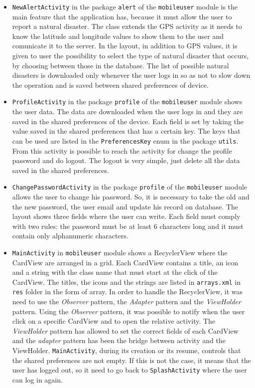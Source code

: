 \documentclass[a4paper,12pt]{report}
\begin{document}
\begin{itemize}
\item \texttt{NewAlertActivity} in the package \texttt{alert} of the \texttt{mobileuser} module is the main feature that the application has, because it must allow the user to report a natural disaster. The class extends the GPS activity as it needs to know the latitude and longitude values to show them to the user and comunicate it to the server. In the layout, in addition to GPS values, it is given to user the possibility to select the type of natural disaster that occurs, by choosing between those in the database. The list of possible natural disasters is downloaded only whenever the user logs in so as not to slow down the operation and is saved between shared preferences of device.
\item \texttt{ProfileActivity} in the package \texttt{profile} of the \texttt{mobileuser} module shows the user data. The data are downloaded when the user logs in and they are saved in the shared preferences of the device. Each field is set by taking the value saved in the shared preferences that has a certain key. The keys that can be used are listed in the \texttt{PreferencesKey} enum in the package \texttt{utils}. From this activity is possible to reach the activity for change the profile password and do logout. The logout is very simple, just delete all the data saved in the shared preferences.
\item \texttt{ChangePasswordActivity} in the package \texttt{profile} of the \texttt{mobileuser} module allows the user to change his password. So, it is necessary to take the old and the new password, the user email and update his record on database. The layout shows three fields where the user can write. Each field must comply with two rules: the password must be at least 6 characters long and it must contain only alphanumeric characters.
\item \texttt{MainActivity} in \texttt{mobileuser} module shows a RecyclerView where the CardView are arranged in a grid. Each CardView contains a title, an icon and a string with the class name that must start at the click of the CardView. The titles, the icons and the strings are listed in \texttt{arrays.xml} in \texttt{res} folder in the form of array. In order to handle the RecyclerView, it was need to use the \emph{Observer} pattern, the \emph{Adapter} pattern and the \emph{ViewHolder} pattern. Using the \emph{Observer} pattern, it was possible to notify when the user click on a specific CardView and to open the relative activity. The \emph{ViewHolder} pattern has allowed to set the correct fields of each CardView and the \emph{adapter} pattern has been the bridge between activity and the ViewHolder. \texttt{MainActivity}, during its creation or its resume, controls that the shared preferences are not empty. If this is not the case, it means that the user has logged out, so it need to go back to \texttt{SplashActivity} where the user can log in again.
\end{itemize}
\end{document}
